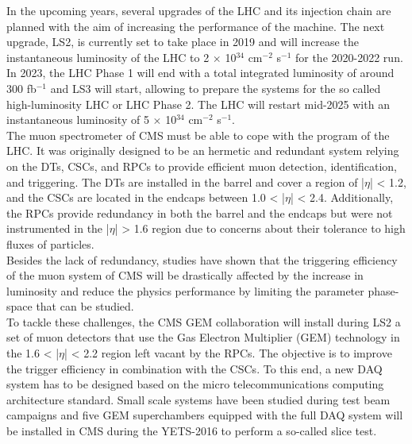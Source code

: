In the upcoming years, several upgrades of the LHC and its injection chain are planned with the aim of increasing the performance of the machine. The next upgrade, LS2, is currently set to take place in 2019 and will increase the instantaneous luminosity of the LHC to 2 $ \times $ 10$^{34}$ cm$^{-2}$ s$^{-1}$ for the 2020-2022 run. In 2023, the LHC Phase 1 will end with a total integrated luminosity of around 300 fb$^{-1}$ and LS3 will start, allowing to prepare the systems for the so called high-luminosity LHC or LHC Phase 2. The LHC will restart mid-2025 with an instantaneous luminosity of 5 $ \times $ 10$^{34}$ cm$^{-2}$ s$^{-1}$. \\

The muon spectrometer of CMS must be able to cope with the program of the LHC. It was originally designed to be an hermetic and redundant system relying on the DTs, CSCs, and RPCs to provide efficient muon detection, identification, and triggering. The DTs are installed in the barrel and cover a region of |$\eta$| < 1.2, and the CSCs are located in the endcaps between 1.0 < |$\eta$| < 2.4. Additionally, the RPCs provide redundancy in both the barrel and the endcaps but were not instrumented in the |$\eta$| > 1.6 region due to concerns about their tolerance to high fluxes of particles. \\

Besides the lack of redundancy, studies have shown that the triggering efficiency of the muon system of CMS will be drastically affected by the increase in luminosity and reduce the physics performance by limiting the parameter phase-space that can be studied. \\

To tackle these challenges, the CMS GEM collaboration \cite{Colaleo:2021453} will install during LS2 a set of muon detectors that use the Gas Electron Multiplier (GEM) technology in the 1.6 < |$\eta$| < 2.2 region left vacant by the RPCs. The objective is to improve the trigger efficiency in combination with the CSCs. To this end, a new DAQ system has to be designed based on the micro telecommunications computing architecture standard. Small scale systems have been studied during test beam campaigns and five GEM superchambers equipped with the full DAQ system will be installed in CMS during the YETS-2016 to perform a so-called slice test. \\

